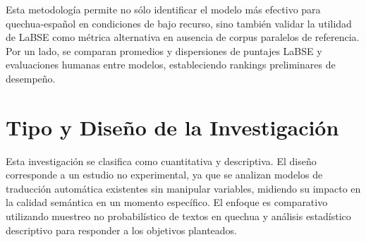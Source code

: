 Esta metodología permite no sólo identificar el modelo más efectivo para quechua-español en condiciones de bajo recurso, sino también validar la utilidad de LaBSE como métrica alternativa en ausencia de corpus paralelos de referencia.  Por un lado, se comparan promedios y dispersiones de puntajes LaBSE y evaluaciones humanas entre modelos, estableciendo rankings preliminares de desempeño.


\section{Tipo y Diseño de la Investigación}

Esta investigación se clasifica como cuantitativa y descriptiva. El diseño corresponde a un estudio no experimental, ya que se analizan modelos de traducción automática existentes sin manipular variables, midiendo su impacto en la calidad semántica en un momento específico. El enfoque es comparativo utilizando muestreo no probabilístico de textos en quechua y análisis estadístico descriptivo para responder a los objetivos planteados.
